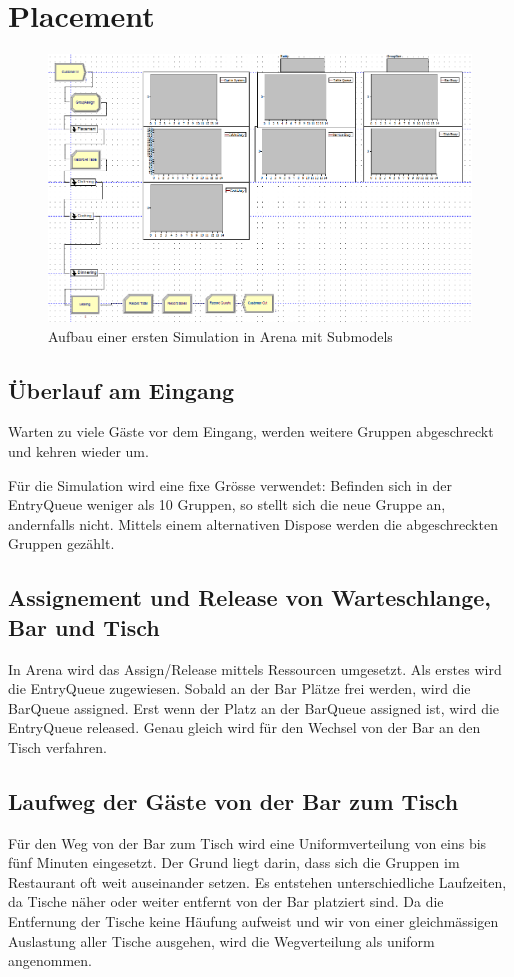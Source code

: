 \documentclass[ngerman,a4paper,12pt]{scrreprt}
\begin{document}
	\section{Placement}
		\begin{figure}[H]
			\centering
				\includegraphics[width=\textwidth]{img/arena.png}
				\caption[Simulationsaufbau in Arena]{Aufbau einer ersten Simulation in Arena mit Submodels}
				\label{arenaSimulationsAufbau}
		\end{figure}
		
		\subsection{Überlauf am Eingang}
			Warten zu viele Gäste vor dem Eingang, werden weitere Gruppen abgeschreckt und kehren wieder um.
		
			Für die Simulation wird eine fixe Grösse verwendet: 			Befinden sich in der EntryQueue weniger als 10 Gruppen, so stellt sich die neue Gruppe an, andernfalls nicht. Mittels einem alternativen Dispose werden die abgeschreckten Gruppen gezählt.
			
			
		\subsection{Assignement und Release von Warteschlange, Bar und Tisch}
			In Arena wird das Assign/Release mittels Ressourcen umgesetzt. Als erstes wird die EntryQueue zugewiesen. Sobald an der Bar Plätze frei werden, wird die BarQueue assigned. Erst wenn der Platz an der BarQueue assigned ist, wird die EntryQueue released. Genau gleich wird für den Wechsel von der Bar an den Tisch verfahren.
	
	
		\subsection{Laufweg der Gäste von der Bar zum Tisch}
			Für den Weg von der Bar zum Tisch wird eine Uniformverteilung von eins bis fünf Minuten eingesetzt. Der Grund liegt darin, dass sich die Gruppen im Restaurant oft weit auseinander setzen. Es entstehen unterschiedliche Laufzeiten, da Tische näher oder weiter entfernt von der Bar platziert sind. Da die Entfernung der Tische keine Häufung aufweist und wir von einer gleichmässigen Auslastung aller Tische ausgehen, wird die Wegverteilung als uniform angenommen.
	
\end{document}
